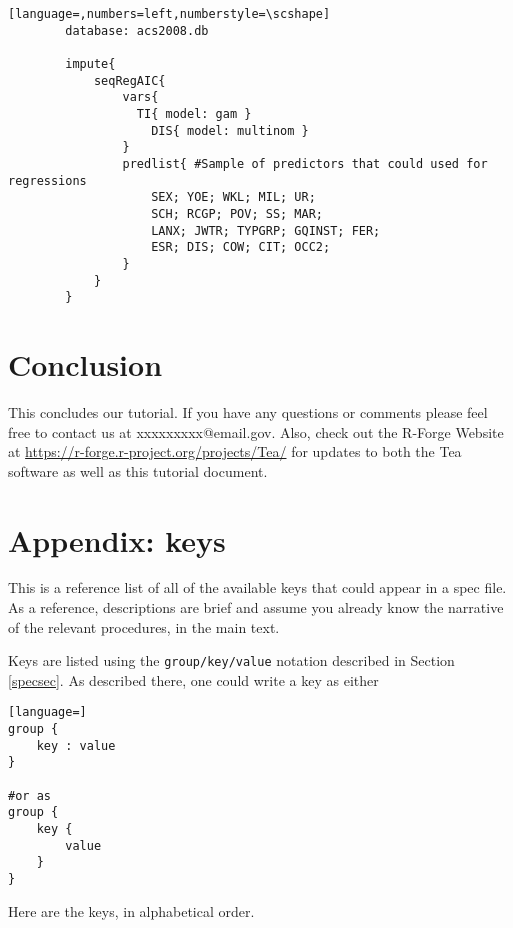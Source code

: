 \documentclass{article}
\begin{document}
        \begin{lstlisting}[language=,numbers=left,numberstyle=\scshape]
        database: acs2008.db

        impute{
            seqRegAIC{
                vars{
                  TI{ model: gam }
                    DIS{ model: multinom }
                }
                predlist{ #Sample of predictors that could used for regressions
                    SEX; YOE; WKL; MIL; UR;
                    SCH; RCGP; POV; SS; MAR;
                    LANX; JWTR; TYPGRP; GQINST; FER;
                    ESR; DIS; COW; CIT; OCC2;
                }
            }
        }

        \end{lstlisting}


\section{Conclusion}
This concludes our tutorial. If you have any questions or comments please feel free to contact 
us at xxxxxxxxx@email.gov. Also, check out the R-Forge Website at 
\url{https://r-forge.r-project.org/projects/Tea/} for updates to both the Tea software as well 
as this tutorial document.

\section*{Appendix: keys}

This is a reference list of all of the available keys that could appear in a spec file.
As a reference, descriptions are brief and assume you already know the narrative of the
relevant procedures, in the main text.

Keys are listed using the {\tt group/key/value} notation described in Section \ref{specsec}. As described there, one could write a key as either
\begin{lstlisting}[language=]
group {
    key : value
}

#or as
group {
    key {
        value
    }
}
\end{lstlisting}

Here are the keys, in alphabetical order.

%

%
%
%
\end{document}
